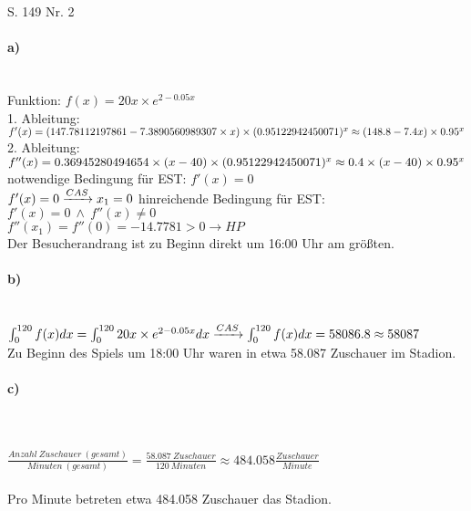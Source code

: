\documentclass[a4paper, 12pt]{report}
\begin{document}
	\noindent
	\LARGE
	S. 149 Nr. 2
	\normalsize
	\paragraph{a)} \mbox{} \\
	Funktion: $f(x) = 20x \times e^{2-0.05x}$ \\
	1. Ableitung: $f'(x) = (147.78112197861-7.3890560989307 \times x) \times  (0.95122942450071)^x \\
	\approx (148.8-7.4x) \times 0.95^x
	$
	\\
	2. Ableitung: $f''(x) = 0.36945280494654\times (x-40)\times (0.95122942450071)^x \\
	\approx 0.4 \times (x - 40) \times 0.95^x $
	\\
	notwendige Bedingung für EST: $f'(x) = 0$ \\
	$
	f'(x) = 0 \\
	\xrightarrow{CAS} x_1 = 0 \\
	$
	hinreichende Bedingung für EST: $f'(x) = 0\ \land\ f''(x) \ne 0$
	\\
	$
	f''(x_1) = f''(0) = -14.7781 > 0 \to HP
	$
	\\[0.25cm]
	Der Besucherandrang ist zu Beginn direkt um 16:00 Uhr am größten.
	\\[0.5cm]
	
	\paragraph{b)} \mbox{} \\
	$
	\int_{0}^{120}f(x)dx = \int_{0}^{120}20x \times e^{2-0.05x} dx \\
	\xrightarrow{CAS} \int_{0}^{120} f(x) dx = 58086.8 \approx 58087
	$ \\
	Zu Beginn des Spiels um 18:00 Uhr waren in etwa 58.087 Zuschauer im Stadion.
	\\[0.5cm]
	
	\paragraph{c)} \mbox{} \\\\
	$
	\frac{Anzahl\ Zuschauer\ (gesamt)}{Minuten\ (gesamt)} = \frac{58.087\ Zuschauer}{120\ Minuten} \approx 484.058 \frac{Zuschauer}{Minute} 
	$\\\\
	Pro Minute betreten etwa 484.058 Zuschauer das Stadion.
	
\end{document}
